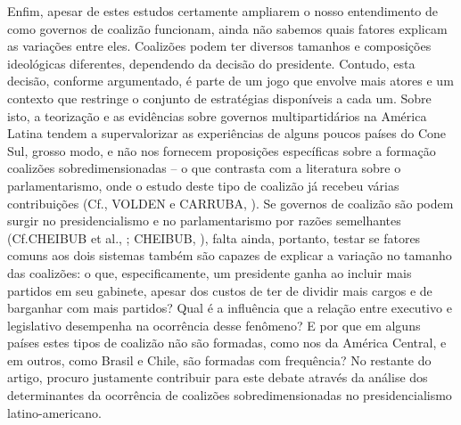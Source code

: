 Enfim, apesar de estes estudos certamente ampliarem o nosso entendimento de como governos de coalizão funcionam, ainda não sabemos quais fatores explicam as variações entre eles. Coalizões podem ter diversos tamanhos e composições ideológicas diferentes, dependendo da decisão do presidente. Contudo, esta decisão, conforme argumentado, é parte de um jogo que envolve mais atores e um contexto que restringe o conjunto de estratégias disponíveis a cada um. Sobre isto, a teorização e as evidências sobre governos multipartidários na América Latina tendem a supervalorizar as experiências de alguns poucos países do Cone Sul, grosso modo, e não nos fornecem proposições específicas sobre a formação coalizões sobredimensionadas -- o que contrasta com a literatura sobre o parlamentarismo, onde o estudo deste tipo de coalizão já recebeu várias contribuições (Cf., VOLDEN e CARRUBA, \citeyear{volden2004}). Se governos de coalizão são podem surgir no presidencialismo e no parlamentarismo por razões semelhantes (Cf.CHEIBUB et al., \citeyear{cheibub2004}; CHEIBUB, \citeyear{cheibub2007}), falta ainda, portanto, testar se fatores comuns aos dois sistemas também são capazes de explicar a variação no tamanho das coalizões: o que, especificamente, um presidente ganha ao incluir mais partidos em seu gabinete, apesar dos custos de ter de dividir mais cargos e de barganhar com mais partidos? Qual é a influência que a relação entre executivo e legislativo desempenha na ocorrência desse fenômeno? E por que em alguns países estes tipos de coalizão não são formadas, como nos da América Central, e em outros, como Brasil e Chile, são formadas com frequência? No restante do artigo, procuro justamente contribuir para este debate através da análise dos determinantes da ocorrência de coalizões sobredimensionadas no presidencialismo latino-americano.

